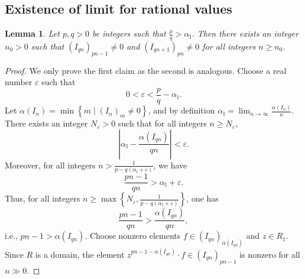 \documentclass[12pt,a4paper]{amsart}
\theoremstyle{plain}
\newtheorem{lemma}[theorem]{Lemma}
\theoremstyle{definition}
\numberwithin{equation}{theorem}
\begin{document}
\subsection{Existence of limit for rational values}

\begin{lemma}\label{lem_converge}
Let $p,q>0$ be integers such that $\tfrac{p}{q}>\alpha_{\mathbb{I}}$. Then there exists an integer $n_0>0$ such that ${\left(I_{qn}\right)}_{pn-1}\neq 0$ and ${\left(I_{qn+1}\right)}_{pn}\neq 0$ for all integers $n\geq n_0$.
\end{lemma}
\begin{proof}
We only prove the first claim as the second is analogous. Choose a real number $\varepsilon$ such that $$0 < \varepsilon < \frac{p}{q}-\alpha_{\mathbb{I}}.$$ Let $\alpha(I_n) = \min\left\{m \mid {\left(I_n\right)}_m\neq 0\right\}$, and by definition $\alpha_{\mathbb{I}} = \lim_{n\to\infty} \frac{\alpha(I_n)}{n}$. There exists an integer $N_{\varepsilon}>0$ such that for all integers $n\geq N_{\varepsilon}$, $$\left\vert \alpha_{\mathbb{I}} - \frac{\alpha(I_{qn})}{qn}\right\vert<\varepsilon.$$ Moreover, for all integers $n>\frac{1}{p-q(\alpha_{\mathbb{I}}+\varepsilon)}$, we have $$\frac{pn-1}{qn}>\alpha_{\mathbb{I}}+\varepsilon.$$ Thus, for all integers $n\geq \max\left\{N_{\varepsilon},\frac{1}{p-q(\alpha_{\mathbb{I}}+\varepsilon)}\right\}$, one has $$\frac{pn-1}{qn} > \frac{\alpha(I_{qn})}{qn},$$ i.e., $pn-1>\alpha(I_{qn})$. Choose nonzero elements $f\in{\left(I_{qn}\right)}_{\alpha(I_{qn})}$ and $z\in R_1$. Since $R$ is a domain, the element $z^{pn-1-\alpha(I_{qn})}\cdot f \in {\left(I_{qn}\right)}_{pn-1}$ is nonzero for all $n\gg 0$.
\end{proof}
\end{document}
